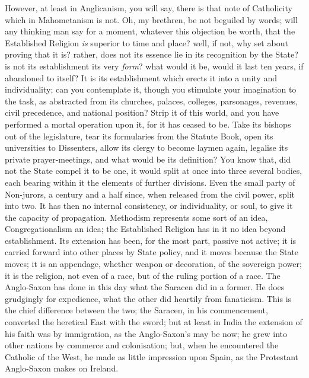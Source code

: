 However, at least in Anglicanism, you will say, there is that note
of Catholicity which in Mahometanism is not. Oh, my brethren, be not
beguiled by words; will any thinking man say for a moment, whatever
this objection be worth, that the Established Religion \emph{is}
superior to time and place? well, if not, why set about proving that
it is? rather, does not its essence lie in its recognition by the
State? is not its establishment its very \emph{form}? what would it
be, would it last ten years, if abandoned to itself? It is its
establishment which erects it into a unity and individuality; can you
contemplate it, though you stimulate your imagination to the task, as
abstracted from its churches, palaces, colleges, parsonages, revenues,
civil precedence, and national position? Strip it of this world, and
you have performed a mortal operation upon it, for it has ceased to
be. Take its bishops out of the legislature, tear its formularies from
the Statute Book, open its universities to Dissenters, allow its
clergy to become laymen again, legalise its private prayer-meetings,
and what would be its definition? You know that, did not the State
compel it to be one, it would split at once into three several bodies,
each bearing within it the elements of further divisions. Even the
small party of Non-jurors, a century and a half since, when released
from the civil power, split into two. It has then no internal
consistency, or individuality, or soul, to give it the capacity of
propagation. Methodism represents some sort of an idea,
Congregationalism an idea; the Established Religion has in it no idea
beyond establishment. Its extension has been, for the most part,
passive not active; it is carried forward into other places by State
policy, and it moves because the State moves; it is an appendage,
whether weapon or decoration, of the sovereign power; it is the
religion, not even of a race, but of the ruling portion of a race. The
Anglo-Saxon has done in this day what the Saracen did in a former. He
does grudgingly for expedience, what the other did heartily from
fanaticism. This is the chief difference between the two; the Saracen,
in his commencement, converted the heretical East with the sword; but
at least in India the extension of his faith was by immigration, as
the Anglo-Saxon's may be now; he grew into other nations by commerce
and colonisation; but, when he encountered the Catholic of the West,
he made as little impression upon Spain, as the Protestant Anglo-Saxon
makes on Ireland.

